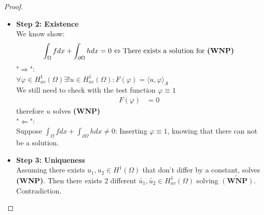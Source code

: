 \documentclass[a4paper,11pt,oneside,fleqn]{book}
\theoremstyle{definition}
\theoremstyle{remark}
\begin{document}
\begin{proof}
\begin{itemize}
\begin{equation*}
\begin{aligned}
	&u \in H^1_{av}(\Omega)
\end{aligned}
\right.
\end{equation*}
admits an unique solution.
\item \textbf{Step 2: Existence}\\
We know show:
\begin{align*}
	\int_\Omega f dx + \int_{\partial \Omega} h dx = 0 \Leftrightarrow
	\text{There exists a solution for \textbf{(WNP)}}
\end{align*}
"$\Rightarrow$":\\
$\forall \varphi \in H_{av}^1(\Omega) \exists! u \in H_{av}^1(\Omega) : F(\varphi) = \langle u , \varphi \rangle_A$ \\
We still need to check with the test function $\varphi \equiv 1$
\begin{align*}
	F(\varphi) &= 0
\end{align*}
therefore $u$ solves \textbf{(WNP)}\\
"$\Leftarrow$": \\
Suppose $\int_\Omega f dx + \int_{\partial \Omega} h dx \neq 0$: Inserting $\varphi \equiv 1$, knowing that there can not be a solution.
\item 
\textbf{Step 3: Uniqueness}\\  
Assuming there exists $u_1, u_2 \in H^1(\Omega)$ that don't differ by a constant, solves \textbf{(WNP)}. Then there exists 2 different $\tilde{u_1}, \tilde{u_2} \in H^1_{av}(\Omega)$ solving $\tilde{(\textbf{WNP})}$. Contradiction.
\end{itemize}
\end{proof}
\end{document}
